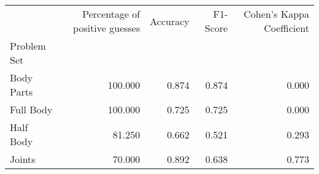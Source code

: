 \begin{table}
      \caption[]{}
      \label{}
      \begin{tabular}{lrrrr}
\hline
{} &  Percentage of positive guesses &  Accuracy &  F1-Score &  Cohen's Kappa Coefficient \\
Problem Set   &                                 &           &           &                            \\
\hline
Body Parts &                         100.000 &     0.874 &     0.874 &                      0.000 \\
Full Body  &                         100.000 &     0.725 &     0.725 &                      0.000 \\
Half Body  &                          81.250 &     0.662 &     0.521 &                      0.293 \\
Joints     &                          70.000 &     0.892 &     0.638 &                      0.773 \\
\hline
\end{tabular}
\end{table}